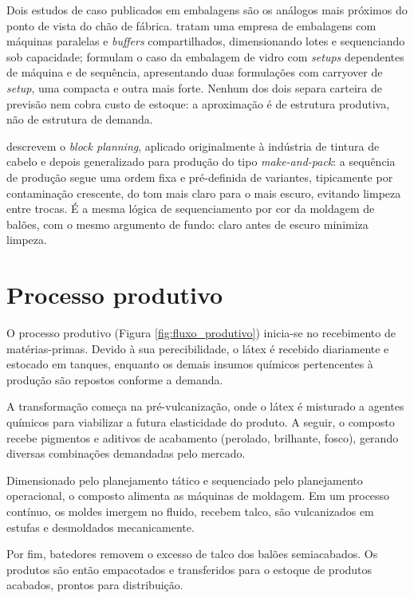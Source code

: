 \documentclass[fleqn,12pt,a4paper]{article}
\begin{document}
Dois estudos de caso publicados em embalagens são os análogos mais próximos do ponto de vista do chão de fábrica.  tratam uma empresa de embalagens com máquinas paralelas e \textit{buffers} compartilhados, dimensionando lotes e sequenciando sob capacidade;  formulam o caso da embalagem de vidro com \textit{setups} dependentes de máquina e de sequência, apresentando duas formulações com carryover de \textit{setup}, uma compacta e outra mais forte. Nenhum dos dois separa carteira de previsão nem cobra custo de estoque: a aproximação é de estrutura produtiva, não de estrutura de demanda.

 descrevem o \textit{block planning}, aplicado originalmente à indústria de tintura de cabelo e depois generalizado para produção do tipo \textit{make-and-pack}: a sequência de produção segue uma ordem fixa e pré-definida de variantes, tipicamente por contaminação crescente, do tom mais claro para o mais escuro, evitando limpeza entre trocas. É a mesma lógica de sequenciamento por cor da moldagem de balões, com o mesmo argumento de fundo: claro antes de escuro minimiza limpeza.

\newpage

\section{Processo produtivo}

O processo produtivo (Figura \ref{fig:fluxo_produtivo}) inicia-se no recebimento de matérias-primas. Devido à sua perecibilidade, o látex é recebido diariamente e estocado em tanques, enquanto os demais insumos químicos pertencentes à produção são repostos conforme a demanda.

A transformação começa na pré-vulcanização, onde o látex é misturado a agentes químicos para viabilizar a futura elasticidade do produto. A seguir, o composto recebe pigmentos e aditivos de acabamento (perolado, brilhante, fosco), gerando diversas combinações demandadas pelo mercado.

Dimensionado pelo planejamento tático e sequenciado pelo planejamento operacional, o composto alimenta as máquinas de moldagem. Em um processo contínuo, os moldes imergem no fluido, recebem talco, são vulcanizados em estufas e desmoldados mecanicamente.

Por fim, batedores removem o excesso de talco dos balões semiacabados. Os produtos são então empacotados e transferidos para o estoque de produtos acabados, prontos para distribuição.
\end{document}
